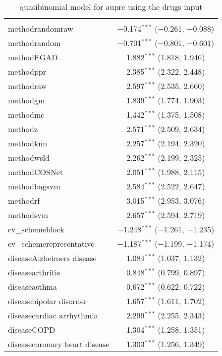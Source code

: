 
\begin{table}[!htbp] \centering 
  \caption{quasibinomial model for auprc using the drugs input} 
  \label{} 
\begin{tabular}{@{\extracolsep{5pt}}lc} 
\\[-1.8ex]\hline 
\hline \\[-1.8ex] 
 methodrandomraw & $-$0.174$^{***}$ ($-$0.261, $-$0.088) \\ 
  methodrandom & $-$0.701$^{***}$ ($-$0.801, $-$0.601) \\ 
  methodEGAD & 1.882$^{***}$ (1.818, 1.946) \\ 
  methodppr & 2.385$^{***}$ (2.322, 2.448) \\ 
  methodraw & 2.597$^{***}$ (2.535, 2.660) \\ 
  methodgm & 1.839$^{***}$ (1.774, 1.903) \\ 
  methodmc & 1.442$^{***}$ (1.375, 1.508) \\ 
  methodz & 2.571$^{***}$ (2.509, 2.634) \\ 
  methodknn & 2.257$^{***}$ (2.194, 2.320) \\ 
  methodwsld & 2.262$^{***}$ (2.199, 2.325) \\ 
  methodCOSNet & 2.051$^{***}$ (1.988, 2.115) \\ 
  methodbagsvm & 2.584$^{***}$ (2.522, 2.647) \\ 
  methodrf & 3.015$^{***}$ (2.953, 3.076) \\ 
  methodsvm & 2.657$^{***}$ (2.594, 2.719) \\ 
  cv\_schemeblock & $-$1.248$^{***}$ ($-$1.261, $-$1.235) \\ 
  cv\_schemerepresentative & $-$1.187$^{***}$ ($-$1.199, $-$1.174) \\ 
  diseaseAlzheimers disease & 1.084$^{***}$ (1.037, 1.132) \\ 
  diseasearthritis & 0.848$^{***}$ (0.799, 0.897) \\ 
  diseaseasthma & 0.672$^{***}$ (0.622, 0.722) \\ 
  diseasebipolar disorder & 1.657$^{***}$ (1.611, 1.702) \\ 
  diseasecardiac arrhythmia & 2.299$^{***}$ (2.255, 2.343) \\ 
  diseaseCOPD & 1.304$^{***}$ (1.258, 1.351) \\ 
  diseasecoronary heart disease & 1.303$^{***}$ (1.256, 1.349) \\ 

\end{tabular}
\end{table}
